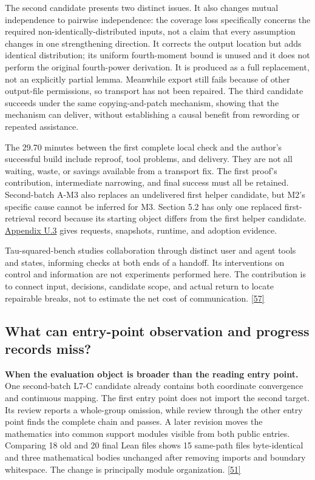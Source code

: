 The second candidate presents two distinct issues. It also changes mutual independence to pairwise independence: the coverage loss specifically concerns the required non-identically-distributed inputs, not a claim that every assumption changes in one strengthening direction. It corrects the output location but adds identical distribution; its uniform fourth-moment bound is unused and it does not perform the original fourth-power derivation. It is produced as a full replacement, not an explicitly partial lemma. Meanwhile export still fails because of other output-file permissions, so transport has not been repaired. The third candidate succeeds under the same copying-and-patch mechanism, showing that the mechanism can deliver, without establishing a causal benefit from rewording or repeated assistance.

The 29.70 minutes between the first complete local check and the author's successful build include reproof, tool problems, and delivery. They are not all waiting, waste, or savings available from a transport fix. The first proof's contribution, intermediate narrowing, and final success must all be retained. Second-batch A-M3 also replaces an undelivered first helper candidate, but M2's specific cause cannot be inferred for M3. Section 5.2 has only one replaced first-retrieval record because its starting object differs from the first helper candidate. \href{en-appendix.pdf\#u3}{Appendix U.3} gives requests, snapshots, runtime, and adoption evidence.

Tau-squared-bench studies collaboration through distinct user and agent tools and states, informing checks at both ends of a handoff. Its interventions on control and information are not experiments performed here. The contribution is to connect input, decisions, candidate scope, and actual return to locate repairable breaks, not to estimate the net cost of communication. \hyperlink{ref-57}{\mbox{[57]}}

\subsection[What can entry-point observation and progress records miss?]{\texorpdfstring{\protect\hypertarget{section-5-5}{}What can entry-point observation and progress records miss?}{What can entry-point observation and progress records miss?}}
\textbf{When the evaluation object is broader than the reading entry point.} One second-batch L7-C candidate already contains both coordinate convergence and continuous mapping. The first entry point does not import the second target. Its review reports a whole-group omission, while review through the other entry point finds the complete chain and passes. A later revision moves the mathematics into common support modules visible from both public entries. Comparing 18 old and 20 final Lean files shows 15 same-path files byte-identical and three mathematical bodies unchanged after removing imports and boundary whitespace. The change is principally module organization. \hyperlink{ref-51}{\mbox{[51]}}

